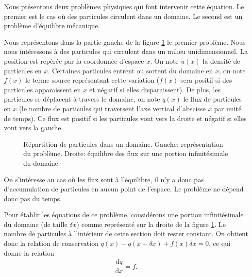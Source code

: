 \documentclass[12pt,a4paper,twoside]{article}
\begin{document}
Nous pr\'esentons deux probl\`emes physiques qui font intervenir
cette \'equation.
Le premier est le cas o\`u des particules circulent dans un domaine.
Le second est un probl\`eme d'\'equilibre m\'ecanique.


Nous repr\'esentons dans la partie gauche de la figure \ref{fig:flux} 
le premier probl\`eme.
Nous nous int\'eressons \`a des particules qui circulent 
dans un milieu unidimensionnel. La position est
rep\'er\'ee par la coordonn\'ee d'espace $x$. On note $u(x)$ la densit\'e
de particules en $x$. Certaines particules entrent ou sortent du domaine
en $x$, on note $f(x)$ le terme source repr\'esentant cette variation
($f(x)$ sera positif si des particules apparaissent en $x$ 
et n\'egatif si elles disparaissent).
De plus, les particules se d\'eplacent \`a travers le domaine,
on note $q(x)$ le flux de particules en $x$
(le nombre de particules qui traversent l'axe vertical d'abscisse $x$
par unit\'e de temps). Ce flux est positif si les particules 
vont vers la droite et n\'egatif si elles vont vers la gauche.

\begin{figure}
\begin{tikzpicture}[scale = 3]
  
\end{tikzpicture}
\begin{tikzpicture}[scale = 2.5]
  
\end{tikzpicture}
\caption{R\'epartition de particules dans un domaine. Gauche: repr\'esentation du probl\`eme.
  Droite: \'equilibre des flux sur une portion infinit\'esimale du domaine.}
\label{fig:flux}
\end{figure}


On s'int\'eresse au cas o\`u les flux sont \`a l'\'equilibre, il n'y
a donc pas d'accumulation de particules en aucun point de l'espace.
Le probl\`eme ne d\'epend donc pas du temps.


Pour \'etablir les \'equations de ce probl\`eme,
consid\'erons une portion infinit\'esimale du domaine (de taille $\delta x$) comme
repr\'esent\'e sur la droite de la figure \ref{fig:flux}.
Le nombre de particules \`a l'int\'erieur de cette section doit
rester constant.
On obtient donc la relation de conservation
$q(x) - q(x+\delta x) + f(x) \delta x = 0$,
ce qui donne la relation
\begin{align}
  \label{eq:eq_flux}
  \dfrac{\mathrm{d} q}{\mathrm{d} x} = f .
\end{align}
\end{document}
